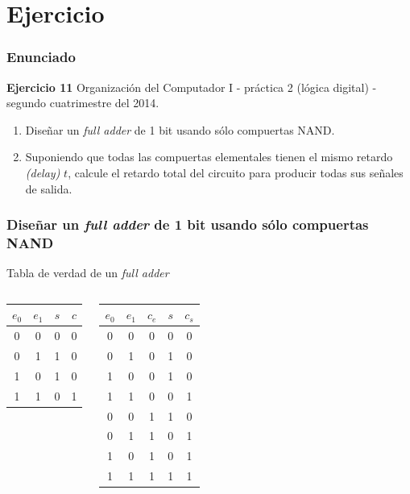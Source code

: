 \documentclass[mathserif,hyperref]{beamer}
\begin{document}
\section{Ejercicio}

\begin{frame}
\frametitle{Enunciado}
\textbf{Ejercicio 11}
{\tiny Organización del Computador I - práctica 2 (lógica digital) - segundo
cuatrimestre del 2014.}
\begin{enumerate}
  \item Diseñar un \textit{full adder} de 1 bit usando sólo compuertas NAND.
  \item Suponiendo que todas las compuertas elementales tienen el mismo
  retardo \textit{(delay)} $t$, calcule el retardo total del circuito para
  producir todas sus señales de salida.
\end{enumerate}
\end{frame}


\begin{frame}
\frametitle{\small Diseñar un \textit{full adder} de 1 bit usando sólo
compuertas NAND}
Tabla de verdad de un \textit{full adder}
\begin{columns}
    \pause
    \begin{center}\begin{tabular}{| c | c || c | c |}
      \hline
      $e_0$ & $e_1$ & $s$ & $c$ \\ \hline
        0   &   0   &  0  &  0  \\
        0   &   1   &  1  &  0  \\
        1   &   0   &  1  &  0  \\
        1   &   1   &  0  &  1  \\
      \hline
    \end{tabular}\end{center}
    \pause
    \begin{center}\begin{tabular}{| c | c | c || c | c |}
      \hline
      $e_0$ & $e_1$ & $c_e$ & $s$ & $c_s$ \\ \hline
        0   &   0   &   0   &  0  &   0   \\
        0   &   1   &   0   &  1  &   0   \\
        1   &   0   &   0   &  1  &   0   \\
        1   &   1   &   0   &  0  &   1   \\
        0   &   0   &   1   &  1  &   0   \\
        0   &   1   &   1   &  0  &   1   \\
        1   &   0   &   1   &  0  &   1   \\
        1   &   1   &   1   &  1  &   1   \\
      \hline
    \end{tabular}\end{center}
\end{columns}
\end{frame}
\end{document}
